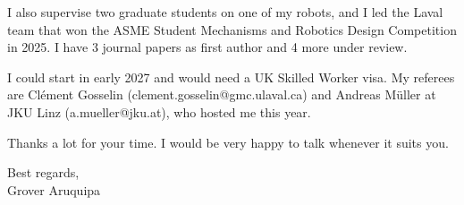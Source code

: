 \documentclass[11pt,a4paper]{article}
\begin{document}
I also supervise two graduate students on one of my robots, and I led the Laval team that won the ASME Student Mechanisms and Robotics Design Competition in 2025. I have 3 journal papers as first author and 4 more under review.

I could start in early 2027 and would need a UK Skilled Worker visa. My referees are Cl\'ement Gosselin (clement.gosselin@gmc.ulaval.ca) and Andreas M\"uller at JKU Linz (a.mueller@jku.at), who hosted me this year.

Thanks a lot for your time. I would be very happy to talk whenever it suits you.

Best regards,\\
Grover Aruquipa
\end{document}
